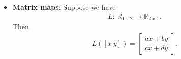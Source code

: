 \documentclass{report}
\begin{document}
\begin{itemize}
            \item \textbf{Matrix maps}:
                Suppose we have 
                \begin{align*}
                    L:\ \mathbb{R}_{1\times 2} \to \mathbb{R}_{2\times 1}
                .\end{align*}
                Then
                \begin{align*}
                    L([x\ y]) = \begin{bmatrix}
                        ax + by \\
                        cx + dy
                    \end{bmatrix}
                .\end{align*}

    \end{itemize}

    \pagebreak 
\end{document}
